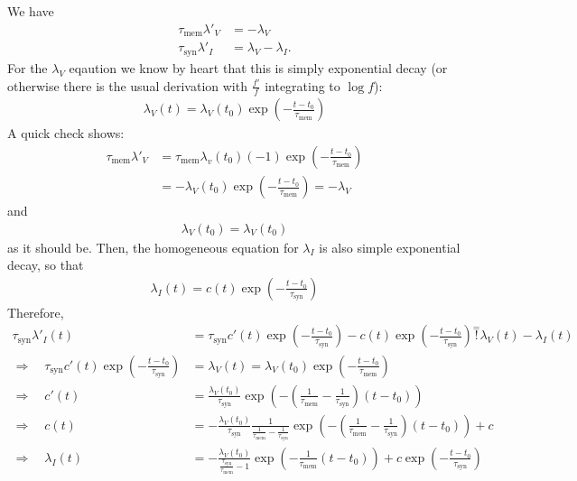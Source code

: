 \documentclass[a4paper]{article}
\begin{document}
We have
\begin{align}
  \tau_{\text{mem}} \lambda'_V &= - \lambda_V \\
  \tau_{\text{syn}} \lambda'_I &= \lambda_V - \lambda_I .
\end{align}
For the $\lambda_V$ eqaution we know by heart that this is simply exponential decay (or otherwise there is the usual derivation with $\frac{f'}{f}$ integrating to $\log f$):
\begin{align}
  \lambda_V(t) = \lambda_V(t_0) \exp\left(-\frac{t-t_0}{\tau_{\text{mem}}}\right)
\end{align}  
A quick check shows:
\begin{align}
  \tau_{\text{mem}} \lambda'_V &= \tau_{\text{mem}} \lambda_v(t_0) (-1) \exp\left(- \frac{t-t_0}{\tau_{\text{mem}}} \right) \\
  &= -\lambda_V(t_0) \exp\left(- \frac{t-t_0}{\tau_{\text{mem}}} \right) = - \lambda_V
\end{align}
and
\begin{align}
  \lambda_V(t_0)= \lambda_V(t_0)
\end{align}
as it should be. Then, the homogeneous equation for $\lambda_I$ is also simple exponential decay, so that
\begin{align}
\lambda_I(t) = c(t) \exp\left(-\frac{t-t_0}{\tau_{\text{syn}}} \right)
\end{align}
Therefore,
\begin{align}
  \tau_{\text{syn}} \lambda'_I (t) &= \tau_{\text{syn}} c'(t) \exp\left(-\frac{t-t_0}{\tau_{\text{syn}}} \right) - c(t) \exp\left(-\frac{t-t_0}{\tau_{\text{syn}}} \right) \stackrel{=}{!} \lambda_V(t) - \lambda_I(t) \\
  \Rightarrow  \quad \tau_{\text{syn}} c'(t) \exp\left(-\frac{t-t_0}{\tau_{\text{syn}}} \right) &= \lambda_V(t) =  \lambda_V(t_0) \exp\left(-\frac{t-t_0}{\tau_{\text{mem}}}\right) \\
  \Rightarrow \quad c'(t) &= \frac{\lambda_V(t_0)}{\tau_{\text{syn}}} \exp \left(-\left(\frac{1}{\tau_{\text{mem}}} - \frac{1}{\tau_{\text{syn}}} \right) (t-t_0)\right) \\
  \Rightarrow \quad c(t) &= - \frac{\lambda_V(t_0)}{\tau_{\text{syn}}} \frac{1}{\frac{1}{\tau_{\text{mem}}} - \frac{1}{\tau_{\text{syn}}}} \exp \left(-\left(\frac{1}{\tau_{\text{mem}}} - \frac{1}{\tau_{\text{syn}}} \right) (t-t_0)\right) +c \\
  \Rightarrow \quad \lambda_I(t) &= -\frac{\lambda_V(t_0)}{\frac{\tau_{\text{syn}}}{\tau_{\text{mem}}} -1} \exp \left( -\frac{1}{\tau_{\text{mem}}} (t-t_0)\right) + c \exp\left(-\frac{t-t_0}{\tau_{\text{syn}}} \right) 
\end{align}
\end{document}
